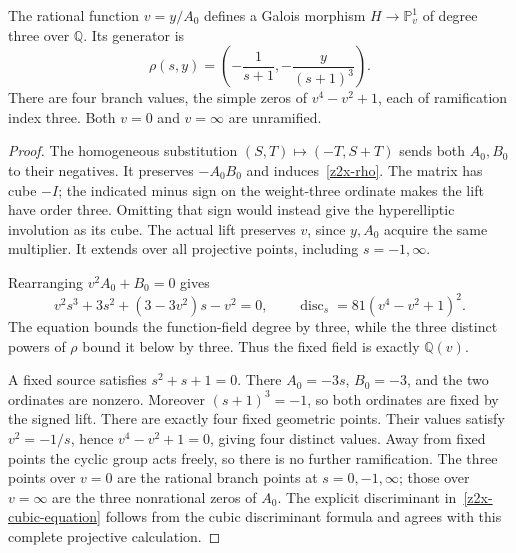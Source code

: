 \begin{proposition}
\label{z2x-cubic-map}
The rational function \(v=y/A_0\) defines a Galois morphism
\(H\to\mathbb P^1_v\) of degree three over \(\mathbb Q\).
Its generator is
\begin{equation}
 \rho(s,y)=\left(-\frac1{s+1},-\frac{y}{(s+1)^3}\right).
 \label{z2x-rho}
\end{equation}
There are four branch values, the simple zeros of \(v^4-v^2+1\),
each of ramification index three. Both \(v=0\) and \(v=\infty\)
are unramified.
\end{proposition}
\begin{proof}
The homogeneous substitution \((S,T)\mapsto(-T,S+T)\) sends
both \(A_0,B_0\) to their negatives. It preserves \(-A_0B_0\)
and induces~\eqref{z2x-rho}. The matrix has cube \(-I\);
the indicated minus sign on the weight-three ordinate makes the
lift have order three. Omitting that sign would instead give
the hyperelliptic involution as its cube. The actual lift
preserves \(v\), since \(y,A_0\) acquire the same multiplier.
It extends over all projective points, including \(s=-1,\infty\).

Rearranging \(v^2A_0+B_0=0\) gives
\begin{equation}
 v^2s^3+3s^2+(3-3v^2)s-v^2=0,\qquad
 \operatorname{disc}_s=81(v^4-v^2+1)^2 .
 \label{z2x-cubic-equation}
\end{equation}
The equation bounds the function-field degree by three, while
the three distinct powers of \(\rho\) bound it below by three.
Thus the fixed field is exactly \(\mathbb Q(v)\).

A fixed source satisfies \(s^2+s+1=0\). There \(A_0=-3s\),
\(B_0=-3\), and the two ordinates are nonzero. Moreover
\((s+1)^3=-1\), so both ordinates are fixed by the signed lift.
There are exactly four fixed geometric points. Their values
satisfy \(v^2=-1/s\), hence \(v^4-v^2+1=0\), giving four
distinct values. Away from fixed points the cyclic group acts
freely, so there is no further ramification. The three points
over \(v=0\) are the rational branch points at \(s=0,-1,\infty\);
those over \(v=\infty\) are the three nonrational zeros of \(A_0\).
The explicit discriminant in~\eqref{z2x-cubic-equation} follows
from the cubic discriminant formula and agrees with this complete
projective calculation.
\end{proof}

